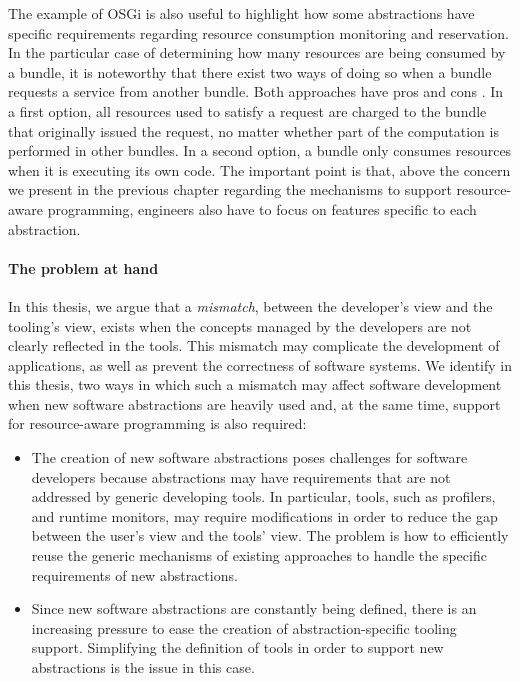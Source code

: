 The example of OSGi is also useful to highlight how some abstractions have specific requirements regarding resource consumption monitoring and reservation.
In the particular case of determining how many resources are being consumed by a bundle, it is noteworthy that there exist two ways of doing so when a bundle requests a service from another bundle.
Both approaches have pros and cons \cite{Miettinen2008,Maurel:2012:AME:2304736.2304763}.
In a first option, all resources used to satisfy a request are charged to the bundle that originally issued the request, no matter whether part of the computation is performed in other bundles.
In a second option, a bundle only consumes resources when it is executing its own code.
The important point is that, above the concern we present in the previous chapter regarding the mechanisms to support resource-aware programming, engineers also have to focus on features specific to each abstraction.

\paragraph{The problem at hand}
In this thesis, we argue that a \textit{mismatch}, between the developer's view and the tooling's view, exists when the concepts managed by the developers are not clearly reflected in the tools.
This mismatch may complicate the development of applications, as well as prevent the correctness of software systems.
We identify in this thesis, two ways in which such a mismatch may affect software development when new software abstractions are heavily used and, at the same time, support for resource-aware programming is also required:

\begin{itemize}
\item The creation of new software abstractions poses challenges for software developers because abstractions may have requirements that are not addressed by generic developing tools.
In particular, tools, such as profilers, and runtime monitors, may require modifications in order to reduce the gap between the user's view and the tools' view.
The problem is how to efficiently reuse the generic mechanisms of existing approaches to handle the specific requirements of new abstractions.

\item Since new software abstractions are constantly being defined, there is an increasing pressure to ease the creation of abstraction-specific tooling support.
Simplifying the definition of tools in order to support new abstractions is the issue in this case. 
\end{itemize}


